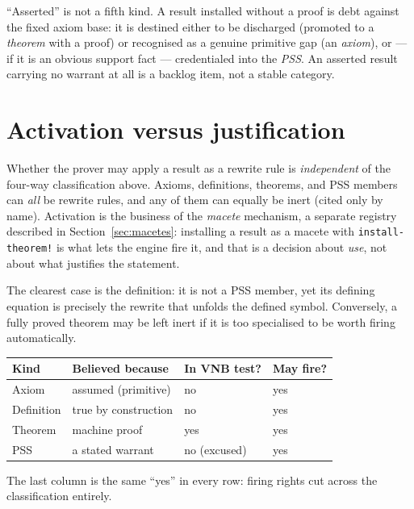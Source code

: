 \begin{remark}
``Asserted'' is not a fifth kind.  A result installed without a proof is
debt against the fixed axiom base: it is destined either to be discharged
(promoted to a \emph{theorem} with a proof) or recognised as a genuine
primitive gap (an \emph{axiom}), or --- if it is an obvious support fact
--- credentialed into the \emph{PSS}.  An asserted result carrying no
warrant at all is a backlog item, not a stable category.
\end{remark}

\section{Activation versus justification}
\label{sec:firing}

Whether the prover may apply a result as a rewrite rule is
\emph{independent} of the four-way classification above.  Axioms,
definitions, theorems, and PSS members can \emph{all} be rewrite rules,
and any of them can equally be inert (cited only by name).  Activation is
the business of the \emph{macete} mechanism, a separate registry described
in Section~\ref{sec:macetes}: installing a result as a macete with
\texttt{install-theorem!} is what lets the engine fire it, and that is a
decision about \emph{use}, not about what justifies the statement.

The clearest case is the definition: it is not a PSS member, yet its
defining equation is precisely the rewrite that unfolds the defined
symbol.  Conversely, a fully proved theorem may be left inert if it is too
specialised to be worth firing automatically.

\begin{center}
\begin{tabular}{@{}llll@{}}
\toprule
\textbf{Kind} & \textbf{Believed because} & \textbf{In VNB test?} & \textbf{May fire?}\\
\midrule
Axiom      & assumed (primitive)   & no  & yes\\
Definition & true by construction  & no  & yes\\
Theorem    & machine proof         & yes & yes\\
PSS        & a stated warrant      & no (excused) & yes\\
\bottomrule
\end{tabular}
\end{center}

\noindent
The last column is the same ``yes'' in every row: firing rights cut across
the classification entirely.

